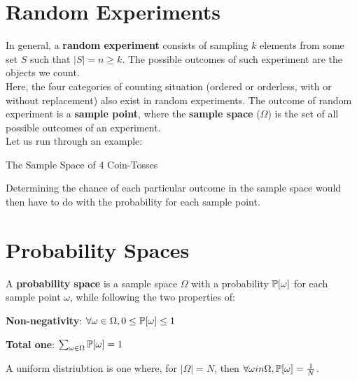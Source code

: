 \section{Random Experiments}
In general, a \textbf{random experiment} consists of sampling $k$ elements from some set $S$ such that $|S| = n \geq k$. The possible outcomes of such experiment are the objects we count. \\
Here, the four categories of counting situation (ordered or orderless, with or without replacement) also exist in random experiments. The outcome of random experiment is a \textbf{sample point}, where the \textbf{sample space} ($\Omega$) is the set of all possible outcomes of an experiment. \\
Let us run through an example:
\begin{ln-fig}{The Sample Space of 4 Coin-Tosses}{}
    \begin{center}
    \end{center}
\end{ln-fig}
Determining the chance of each particular outcome in the sample space would then have to do with the probability for each sample point.

\section{Probability Spaces}
A \textbf{probability space} is a sample space $\Omega$ with a probability $\P[\omega]$ for each sample point $\omega$, while following the two properties of:
\begin{bindenum}
    \item \textbf{Non-negativity}: $\forall \omega \in \Omega, 0 \leq \P[\omega] \leq 1$
    \item \textbf{Total one}: $\sum_{\omega \in \Omega} \P[\omega] = 1$
\end{bindenum}
A uniform distriubtion is one where, for $|\Omega| = N$, then $\forall \omega in \Omega, \P[\omega] = \frac{1}{N}$.

